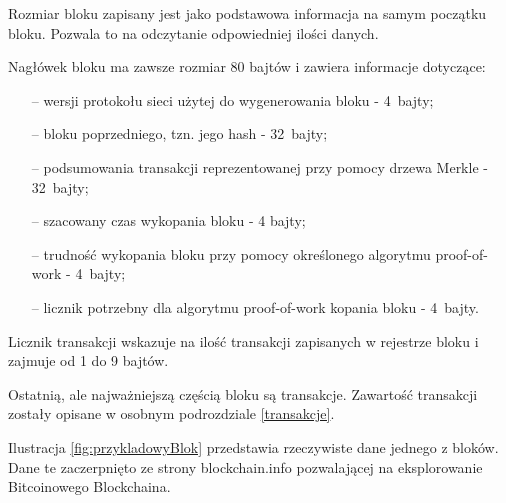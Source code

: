 \documentclass[12pt, twoside, final, openany]{mgr}
\begin{document}
\indent Rozmiar bloku zapisany jest jako podstawowa informacja na samym początku bloku. Pozwala to na odczytanie odpowiedniej ilości danych. 

\indent Nagłówek bloku ma zawsze rozmiar 80 bajtów i zawiera informacje dotyczące:
\begin{itemize}
\item[--] wersji protokołu sieci użytej do wygenerowania bloku - 4~bajty;
\item[--] bloku poprzedniego, tzn. jego hash - 32~bajty;
\item[--] podsumowania transakcji reprezentowanej przy pomocy drzewa Merkle - 32~bajty;
\item[--] szacowany czas wykopania bloku - 4 bajty;
\item[--] trudność wykopania bloku przy pomocy określonego algorytmu proof-of-work - 4~bajty;
\item[--] licznik potrzebny dla algorytmu proof-of-work kopania bloku - 4~bajty.
\end{itemize} 

\indent Licznik transakcji wskazuje na ilość transakcji zapisanych w rejestrze bloku i zajmuje od 1 do 9 bajtów.

\indent Ostatnią, ale najważniejszą częścią bloku są transakcje. Zawartość transakcji zostały opisane w osobnym podrozdziale \ref{transakcje}.

\indent Ilustracja \ref{fig:przykladowyBlok} przedstawia rzeczywiste dane jednego z bloków. Dane te zaczerpnięto ze strony blockchain.info pozwalającej na eksplorowanie Bitcoinowego Blockchaina\cite{blockchaininfo}.
\end{document}
